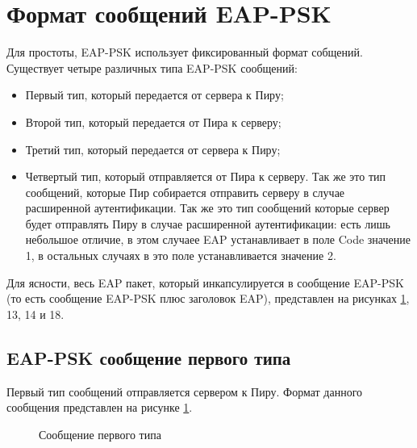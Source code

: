 \newpage
\section{Формат сообщений EAP-PSK}

Для простоты, EAP-PSK использует фиксированный формат собщений. Существует четыре различных типа EAP-PSK сообщений:

\begin{itemize}
\item Первый тип, который передается от сервера к Пиру;
\item Второй тип, который передается от Пира к серверу;
\item Третий тип, который передается от сервера к Пиру;
\item Четвертый тип, который отправляется от Пира к серверу. Так же это тип сообщений, которые Пир собирается отправить серверу в случае расширенной аутентификации. Так же это тип сообщений которые сервер будет отправлять Пиру в случае расширенной аутентификации: есть лишь небольшое отличие, в этом случаее EAP устанавливает в поле Code значение 1, в остальных случаях в это поле устанавливается значение 2.
\end{itemize}

Для ясности, весь EAP пакет, который инкапсулируется в сообщение EAP-PSK (то есть сообщение EAP-PSK плюс заголовок EAP), представлен на рисунках \ref{img:message_type1}, 13, 14 и 18. %

\subsection{EAP-PSK сообщение первого типа}

Первый тип сообщений отправляется сервером к Пиру. Формат данного сообщения представлен на рисунке \ref{img:message_type1}.

\begin{figure}[h!]
\caption{Сообщение первого типа}
\label{img:message_type1}
\end{figure}

